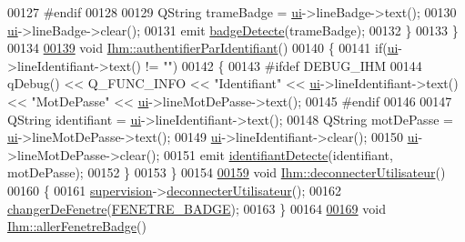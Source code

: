 \begin{DoxyCode}
00127 \textcolor{preprocessor}{        #endif}
00128 
00129         QString trameBadge = \hyperlink{class_ihm_a0ac5f47856566ceeeca1720109bf70ea}{ui}->lineBadge->text();
00130         \hyperlink{class_ihm_a0ac5f47856566ceeeca1720109bf70ea}{ui}->lineBadge->clear();
00131         emit \hyperlink{class_ihm_a15daf0d4cd7c9afd6c97788e54328133}{badgeDetecte}(trameBadge);
00132     \}
00133 \}
00134 
\hyperlink{class_ihm_afac914d96f4070dd7fd9e53d4b5989c1}{00139} \textcolor{keywordtype}{void} \hyperlink{class_ihm_afac914d96f4070dd7fd9e53d4b5989c1}{Ihm::authentifierParIdentifiant}()
00140 \{
00141     \textcolor{keywordflow}{if}(\hyperlink{class_ihm_a0ac5f47856566ceeeca1720109bf70ea}{ui}->lineIdentifiant->text() != \textcolor{stringliteral}{""})
00142     \{
00143 \textcolor{preprocessor}{        #ifdef DEBUG\_IHM}
00144             qDebug() << Q\_FUNC\_INFO << \textcolor{stringliteral}{"Identifiant"} << \hyperlink{class_ihm_a0ac5f47856566ceeeca1720109bf70ea}{ui}->lineIdentifiant->text() << \textcolor{stringliteral}{"MotDePasse"} << 
      \hyperlink{class_ihm_a0ac5f47856566ceeeca1720109bf70ea}{ui}->lineMotDePasse->text();
00145 \textcolor{preprocessor}{        #endif}
00146 
00147         QString identifiant = \hyperlink{class_ihm_a0ac5f47856566ceeeca1720109bf70ea}{ui}->lineIdentifiant->text();
00148         QString motDePasse = \hyperlink{class_ihm_a0ac5f47856566ceeeca1720109bf70ea}{ui}->lineMotDePasse->text();
00149         \hyperlink{class_ihm_a0ac5f47856566ceeeca1720109bf70ea}{ui}->lineIdentifiant->clear();
00150         \hyperlink{class_ihm_a0ac5f47856566ceeeca1720109bf70ea}{ui}->lineMotDePasse->clear();
00151         emit \hyperlink{class_ihm_a7cbb2cb835ec643c0a673082d2956405}{identifiantDetecte}(identifiant, motDePasse);
00152     \}
00153 \}
00154 
\hyperlink{class_ihm_a4c4b8c870f639fba192a3c6eff52883d}{00159} \textcolor{keywordtype}{void} \hyperlink{class_ihm_a4c4b8c870f639fba192a3c6eff52883d}{Ihm::deconnecterUtilisateur}()
00160 \{
00161     \hyperlink{class_ihm_a454ab89ced1b27fcb42d550e443e780c}{supervision}->\hyperlink{class_supervision_a164a1ad89264ea252401818df325eab8}{deconnecterUtilisateur}();
00162     \hyperlink{class_ihm_ab33d5d0a85d60a8d41bae11c34435d50}{changerDeFenetre}(\hyperlink{_ihm_8h_a280ed5a4ea1cf0cd4c224443fa33db12a1f316de8685375f757a120ce0fde7af2}{FENETRE\_BADGE});
00163 \}
00164 
\hyperlink{class_ihm_a08d82e976e48a2f8fced132a4ba22049}{00169} \textcolor{keywordtype}{void} \hyperlink{class_ihm_a08d82e976e48a2f8fced132a4ba22049}{Ihm::allerFenetreBadge}()

\end{DoxyCode}
